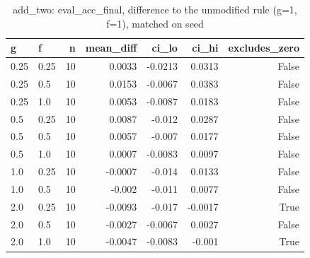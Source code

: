 \begin{table}[t]
\centering
\small
\begin{tabular}{llrrrrr}
\toprule
g & f & n & mean\_diff & ci\_lo & ci\_hi & excludes\_zero \\
\midrule
0.25 & 0.25 & 10 & 0.0033 & -0.0213 & 0.0313 & False \\
0.25 & 0.5 & 10 & 0.0153 & -0.0067 & 0.0383 & False \\
0.25 & 1.0 & 10 & 0.0053 & -0.0087 & 0.0183 & False \\
0.5 & 0.25 & 10 & 0.0087 & -0.012 & 0.0287 & False \\
0.5 & 0.5 & 10 & 0.0057 & -0.007 & 0.0177 & False \\
0.5 & 1.0 & 10 & 0.0007 & -0.0083 & 0.0097 & False \\
1.0 & 0.25 & 10 & -0.0007 & -0.014 & 0.0133 & False \\
1.0 & 0.5 & 10 & -0.002 & -0.011 & 0.0077 & False \\
2.0 & 0.25 & 10 & -0.0093 & -0.017 & -0.0017 & True \\
2.0 & 0.5 & 10 & -0.0027 & -0.0067 & 0.0027 & False \\
2.0 & 1.0 & 10 & -0.0047 & -0.0083 & -0.001 & True \\
\bottomrule
\end{tabular}
\caption{add\_two: eval\_acc\_final, difference to the unmodified rule (g=1, f=1), matched on seed}
\label{tab:plasticity_add_two_eval_acc_final_paired}
\end{table}